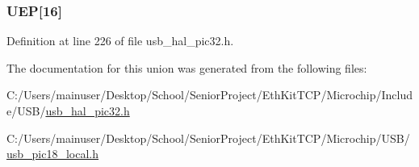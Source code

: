 \subsubsection[{U\+E\+P}]{ U\+E\+P\mbox{[}16\mbox{]}}\label{union___u_e_p_a12c497b0f747f454afa0edcd7d93d0df}


Definition at line 226 of file usb\+\_\+hal\+\_\+pic32.\+h.



The documentation for this union was generated from the following files\+:\begin{DoxyCompactItemize}
\item 
C\+:/\+Users/mainuser/\+Desktop/\+School/\+Senior\+Project/\+Eth\+Kit\+T\+C\+P/\+Microchip/\+Include/\+U\+S\+B/\hyperlink{usb__hal__pic32_8h}{usb\+\_\+hal\+\_\+pic32.\+h}\item 
C\+:/\+Users/mainuser/\+Desktop/\+School/\+Senior\+Project/\+Eth\+Kit\+T\+C\+P/\+Microchip/\+U\+S\+B/\hyperlink{usb__pic18__local_8h}{usb\+\_\+pic18\+\_\+local.\+h}\end{DoxyCompactItemize}
